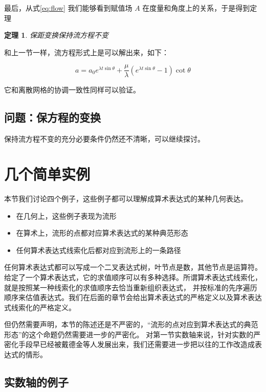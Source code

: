 \documentclass[a4paper,12pt]{article}
\numberwithin{definition}{section}
\numberwithin{lemma}{section}
\numberwithin{proposition}{section}
\newtheorem{theorem}{定理}
\numberwithin{theorem}{section}
\numberwithin{grammar}{section}
\numberwithin{program}{section}
\numberwithin{convention}{section}
\numberwithin{corollary}{section}
\begin{document}
最后，从式\eqref{eq:flow} 我们能够看到赋值场 $A$ 在度量和角度上的关系，于是得到定理

\begin{theorem}
保距变换保持流方程不变\label{thm:isometry}
\end{theorem}

和上一节一样，流方程形式上是可以解出来，如下：

\begin{equation}
   a =  a_0 e^{\lambda t \sin \theta} + \frac{\mu}{\lambda} (e^{\lambda t \sin \theta} - 1) \cot \theta
\end{equation}

它和离散网格的协调一致性同样可以验证。

\subsection{问题：保方程的变换}

保持流方程不变的充分必要条件仍然还不清晰，可以继续探讨。

\newpage

\section{几个简单实例}

本节我们讨论四个例子，这些例子都可以理解成算术表达式的某种几何表达。
\begin{itemize}
    \item 在几何上，这些例子表现为流形
    \item 在算术上，流形的点都对应算术表达式的某种典范形态
    \item 任何算术表达式线索化后都对应到流形上的一条路径
\end{itemize}

任何算术表达式都可以写成一个二叉表达式树，叶节点是数，其他节点是运算符。
给定了一个算术表达式，它的求值顺序可以有多种选择。所谓算术表达式线索化，就是按照某一种线索化的求值顺序去恰当重新组织表达式，
并按标准的先序遍历顺序来估值表达式。我们在后面的章节会给出算术表达式的严格定义以及算术表达式线索化的严格定义。

但仍然需要声明，本节的陈述还是不严密的，“流形的点对应到算术表达式的典范形态”的这个命题仍然需要进一步的严密化。
对第一节实数轴来说，针对实数的严密化手段早已经被戴德金等人发展出来，我们还需要进一步把以往的工作改造成表达式的情形。

\subsection{实数轴的例子}
\end{document}
